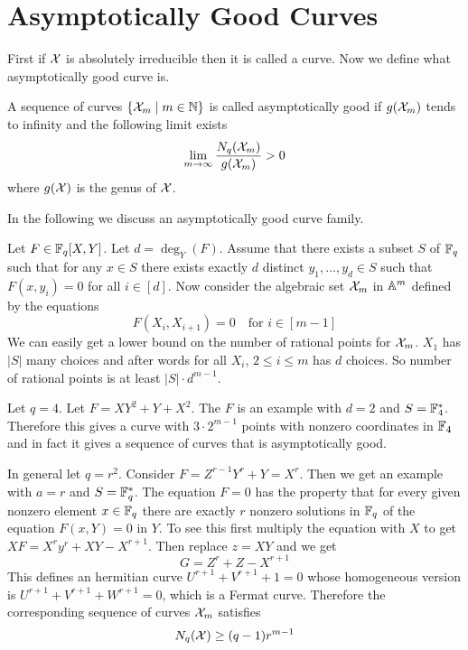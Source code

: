 \section{Asymptotically Good Curves}
First if $\mathcal{X}$ is absolutely irreducible then it is called a curve. Now we define what asymptotically good curve is. 
\begin{definition}
	A sequence of curves $\{\mathcal{X}_m\mid m\in \mathbb{N}\}$ is called asymptotically good if $g(\mathcal{X}_m)$ tends to infinity and the following limit exists $$\lim_{m\to \infty}\frac{N_q(\mathcal{X}_m)}{g(\mathcal{X}_m)}>0$$ where $g(\mathcal{X})$ is the genus of $\mathcal{X}$. 
\end{definition}
In the following we discuss an asymptotically good curve family. 

Let $F\in \mathbb{F}_q[X,Y]$. Let $d=\deg_Y(F)$. Assume that there exists a subset $S$ of $\mathbb{F}_q$ such that for any $x\in S$ there exists exactly $d$ distinct $y_1,\dots, y_d\in S$ such that $F(x,y_i)=0$ for all $i\in [d]$. Now consider the algebraic set $\mathcal{X}_m$ in $\mathbb{A}^m$ defined by the equations $$F(X_i,X_{i+1})=0\quad \text{for $i\in [m-1]$}$$We can easily get a lower bound on the number of rational points for $\mathcal{X}_m$. $X_1$ has $|S|$ many choices and after words for all $X_i$, $2\leq i\leq m$ has $d$ choices. So number of rational points is at least $|S|\cdot d^{m-1}$. 
\begin{example}
	Let $q=4$. Let $F=XY^2+Y+X^2$. The $F$ is an example with $d=2$ and $S=\mathbb{F}^*_4$. Therefore this gives a curve with $3\cdot 2^{m-1}$ points with nonzero coordinates in $\mathbb{F}_4$ and in fact it gives a sequence of curves that is asymptotically good. 
\end{example}
In general let $q=r^2$. Consider $F=Z^{r-1}Y^r+Y=X^r$. Then we get an example with $a=r$ and $S=\mathbb{F}_q^*$. The equation $F=0$ has the property that for every given nonzero element $x\in \mathbb{F}_q$ there are exactly $r$ nonzero solutions in $\mathbb{F}_q$ of the equation $F(x,Y)=0$ in $Y$. To see this first multiply the equation with $X$ to get $XF=X^ry^r+XY-X^{r+1}$. Then replace $z=XY$ and we get $$G=Z^{r}+Z-X^{r+1}$$ This defines an hermitian curve $U^{r+1}+V^{r+1}+1=0$ whose homogeneous version is $U^{r+1}+V^{r+1}+W^{r+1}=0$, which is a Fermat curve. Therefore the corresponding sequence of curves $\mathcal{X}_m$ satisfies $$N_q(\mathcal{X})\geq (q-1)r^{m-1}$$

